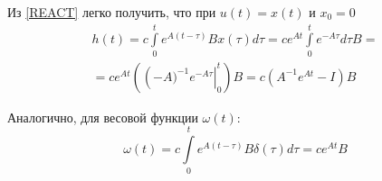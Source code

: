 \documentclass[../../TAU.tex]{subfiles}
\begin{document}

    Из \ref{REACT} легко получить, что при ${u(t) = x(t)}$ и ${x_0 = 0}$
    \begin{multline*}
        h(t) = c \int\limits_{0}^{t} e^{A(t-\tau)}Bx(\tau)d\tau = ce^{At} \int\limits_{0}^{t} e^{-A\tau}d\tau B = 
        \\ = ce^{At}(\left(-A)^{-1}e^{-A\tau}\right\rvert_0^t)B = c(A^{-1}e^{At}-I)B
    \end{multline*}

    Аналогично, для весовой функции $\omega(t)$:
    $$
        \omega(t) = c \int\limits_0^t e^{A(t-\tau)}B\delta(\tau)d\tau = ce^{At}B
    $$
\end{document}
